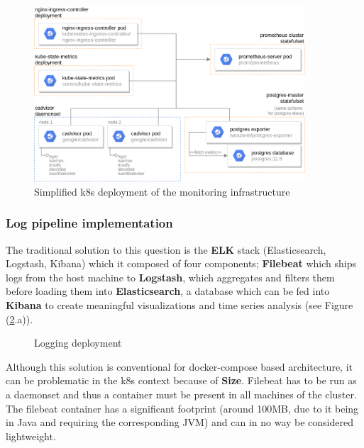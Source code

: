 \documentclass[11pt]{article}
\begin{document}
\begin{figure}[h]
    \centering
    \includegraphics[width=0.9\textwidth]{vulas_monitoring.png}
    \caption{Simplified k8s deployment of the monitoring infrastructure}
    \label{fig:vulas_monitoring}
\end{figure}

\subsubsection{Log pipeline implementation}
\hspace{5mm} The traditional solution to this question is the \textbf{ELK} stack (Elasticsearch, Logstash, Kibana) which it composed of four components; \textbf{Filebeat} which ships logs from the host machine to \textbf{Logstash}, which aggregates and filters them before loading them into \textbf{Elasticsearch}, a database which can be fed into \textbf{Kibana} to create meaningful visualizations and time series analysis (see Figure (\ref{fig:vulas_logging_stack}.a)). 

\begin{figure}[h]
    \centering
    \quad
    \caption{Logging deployment}
    \label{fig:vulas_logging_stack}
\end{figure}

Although this solution is conventional for docker-compose based architecture, it can be problematic in the k8s context because of \textbf{Size}. Filebeat has to be run as a daemonset and thus a container must be present in all machines of the cluster. The filebeat container has a significant footprint (around 100MB, due to it being in Java and requiring the corresponding JVM) and can in no way be considered lightweight.
\end{document}
